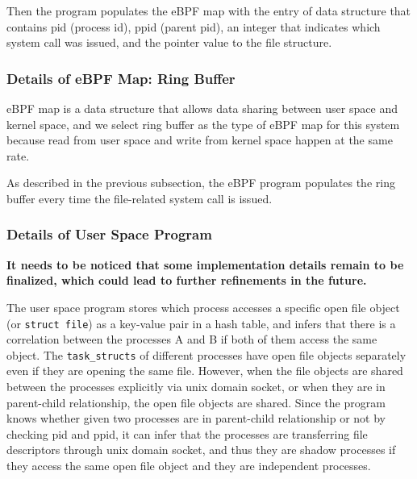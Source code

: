 Then the program populates the eBPF map with the entry of data structure that
contains pid (process id), ppid (parent pid),  an integer that indicates which system call was issued,
and the pointer value to the file structure.

\subsubsection{Details of eBPF Map: Ring Buffer}
eBPF map is a data structure that allows data sharing between user space and kernel space, and
we select ring buffer as the type of eBPF map for this system because read from user space
and write from kernel space happen at the same rate.

As described in the previous subsection, the eBPF program populates the ring buffer
every time the file-related system call is issued.

\subsubsection{Details of User Space Program}
\textbf{It needs to be noticed that some implementation details remain to be finalized, which could
  lead to further refinements in the future.
}

The user space program stores which process accesses a specific open file object (or \texttt{struct file})
as a key-value pair in a hash table, and infers that there is a correlation between the processes
A and B if both of them access the same object.
The \texttt{task\_structs} of different processes have open file objects separately
even if they are opening the same file.
However, when the file objects are shared between the processes explicitly via unix domain socket, or
when they are in parent-child relationship, the open file objects are shared.
Since the program knows whether given two processes are in parent-child relationship or not
by checking pid and ppid,
it can infer that the processes are transferring file descriptors through unix domain socket,
and thus they are shadow processes
if they access the same open file object and they are independent processes.




